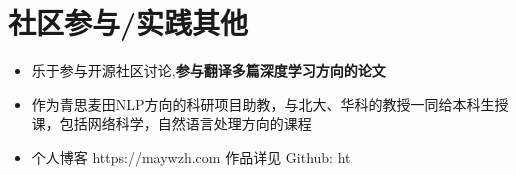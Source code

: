 \documentclass{resume}
\begin{document}
\section{社区参与/实践其他}
\begin{itemize}[parsep=0.2ex]
  \item 乐于参与开源社区讨论,\textbf{参与翻译多篇深度学习方向的论文}
  \item 作为青思麦田NLP方向的科研项目助教，与北大、华科的教授一同给本科生授课，包括网络科学，自然语言处理方向的课程
  \item 个人博客 https://maywzh.com 作品详见 Github: ht
\end{itemize}

%
%
\end{document}
